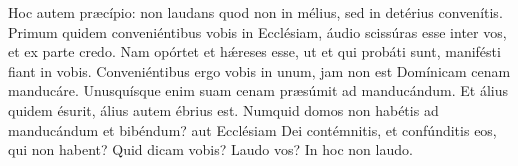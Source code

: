 Hoc autem præcípio:
	non laudans quod non in mélius, sed in detérius convenítis.
Primum quidem conveniéntibus vobis in Ecclésiam,
	áudio scissúras esse inter vos, et ex parte credo.
Nam opórtet et hǽreses esse,
	ut et qui probáti sunt, manifésti fiant in vobis.
Conveniéntibus ergo vobis in unum,
	jam non est Domínicam cenam manducáre.
Unusquísque enim suam cenam præsúmit ad manducándum.
	Et álius quidem ésurit, álius autem ébrius est.
Numquid domos non habétis ad manducándum et bibéndum?
	aut Ecclésiam Dei contémnitis, et confúnditis eos, qui non habent?
Quid dicam vobis? Laudo vos?
	In hoc non laudo.
